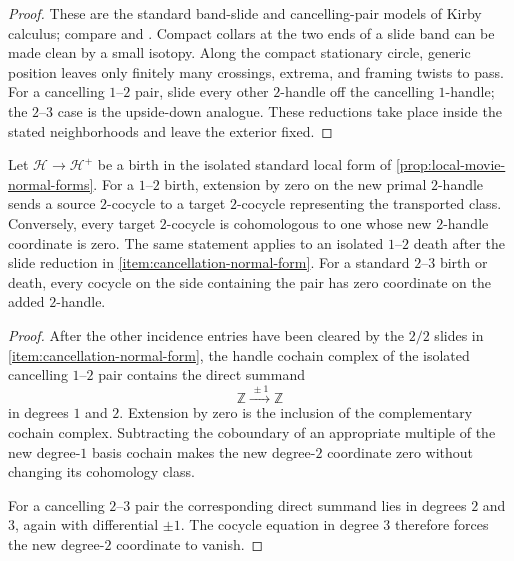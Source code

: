 \begin{proof}
These are the standard band-slide and cancelling-pair models of Kirby
calculus; compare \cite[Sections~5.1 and~5.4]{GompfStipsicz1999} and
\cite[Table~2]{BarenzBarrett2018}.  Compact collars at the two ends of a
slide band can be made clean by a small isotopy.  Along the compact
stationary circle, generic position leaves only finitely many crossings,
extrema, and framing twists to pass.  For a cancelling \(1\)--\(2\) pair,
slide every other \(2\)-handle off the cancelling \(1\)-handle; the
\(2\)--\(3\) case is the upside-down analogue.  These reductions take place
inside the stated neighborhoods and leave the exterior fixed.
\end{proof}

\begin{lemma}
\label{lem:cancellation-cochain-normal-forms}
Let \(\mathcal H\to\mathcal H^+\) be a birth in the isolated standard local
form of \cref{prop:local-movie-normal-forms}.  For a $1$--$2$ birth,
extension by zero on the new primal $2$-handle sends a source $2$-cocycle
to a target $2$-cocycle representing the transported class.  Conversely,
every target $2$-cocycle is cohomologous to one whose new $2$-handle
coordinate is zero.  The same statement applies to an isolated $1$--$2$
death after the slide reduction in \cref{item:cancellation-normal-form}.
For a standard $2$--$3$ birth or death, every cocycle on the side containing
the pair has zero coordinate on the added $2$-handle.
\end{lemma}

\begin{proof}
After the other incidence entries have been cleared by the $2/2$ slides in
\cref{item:cancellation-normal-form}, the handle cochain complex of the
isolated cancelling $1$--$2$ pair contains the direct summand
\[
  \mathbb Z\xrightarrow{\,\pm1\,}\mathbb Z
\]
in degrees $1$ and $2$.  Extension by zero is the inclusion of the
complementary cochain complex.  Subtracting the coboundary of an appropriate
multiple of the new degree-$1$ basis cochain makes the new degree-$2$
coordinate zero without changing its cohomology class.

For a cancelling $2$--$3$ pair the corresponding direct summand lies in
degrees $2$ and $3$, again with differential $\pm1$.  The cocycle equation
in degree $3$ therefore forces the new degree-$2$ coordinate to vanish.
\end{proof}

